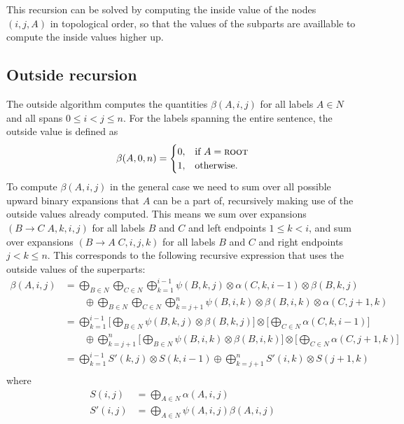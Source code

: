   This recursion can be solved by computing the inside value of the nodes $(i, j, A)$ in topological order, so that the values of the subparts are availlable to compute the inside values higher up.

\subsection{Outside recursion}
  The outside algorithm computes the quantities $\beta(A,i,j)$ for all labels $A \in N$ and all spans $0 \leq i < j \leq n$. For the labels spanning the entire sentence, the outside value is defined as
  \begin{align*}
    \beta(A, 0, n) =
    \begin{cases}
      0, & \text{if}\ A = \textsc{root} \\
      1, & \text{otherwise}.
    \end{cases}
  \end{align*}
  To compute $\beta(A, i, j)$ in the general case we need to sum over all possible upward binary expansions that $A$ can be a part of, recursively making use of the outside values already computed. This means we sum over expansions $(B \to C \; A, k, i, j)$ for all labels $B$ and $C$ and left endpoints $1 \leq k < i$, and sum over expansions $(B \to A \; C, i, j, k)$ for all labels $B$ and $C$ and right endpoints $j < k \leq n$. This corresponds to the following recursive expression that uses the outside values of the superparts:
  \begin{align*}
    \beta(A, i, j)
      &= \bigoplus_{B \in N} \bigoplus_{C \in N} \bigoplus_{k=1}^{i-1} \psi(B, k, j) \otimes \alpha(C, k, i-1) \otimes \beta(B, k, j) \\
        &\qquad \oplus \bigoplus_{B \in N} \bigoplus_{C \in N} \bigoplus_{k=j+1}^{n} \psi(B, i, k) \otimes \beta(B, i, k) \otimes \alpha(C, j+1, k) \\
      &=  \bigoplus_{k=1}^{i-1}  \Bigg[ \bigoplus_{B \in N} \psi(B, k, j)  \otimes \beta(B, k, j) \Bigg] \otimes \Bigg[ \bigoplus_{C \in N} \alpha(C, k, i-1) \Bigg] \\
        &\qquad \oplus \bigoplus_{k=j+1}^{n}  \Bigg[ \bigoplus_{B \in N}  \psi(B, i, k) \otimes \beta(B, i, k) \Bigg] \otimes  \Bigg[  \bigoplus_{C \in N} \alpha(C, j+1, k) \Bigg] \\
      &=  \bigoplus_{k=1}^{i-1}  S'(k, j) \otimes S(k, i-1) \oplus \bigoplus_{k=j+1}^{n} S'(i, k) \otimes  S(j+1, k) \\
  \end{align*}
  where
  \begin{align*}
      S(i, j) &= \bigoplus_{A \in N} \alpha(A, i, j) \\
      S'(i, j) &= \bigoplus_{A \in N} \psi(A, i, j) \beta(A, i, j)
  \end{align*}

